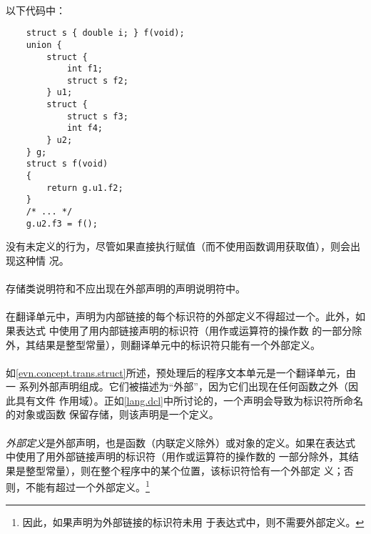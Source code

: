 {\paragraph{}
\ex* 以下代码中：
\begin{lstlisting}
    struct s { double i; } f(void);
    union {
        struct {
            int f1;
            struct s f2;
        } u1;
        struct {
            struct s f3;
            int f4;
        } u2;
    } g;
    struct s f(void)
    {
        return g.u1.f2;
    }
    /* ... */
    g.u2.f3 = f();
\end{lstlisting}
没有未定义的行为，尽管如果直接执行赋值（而不使用函数调用获取值），则会出现这种情
况。

\syntax
\paragraph{}

\constraint
\paragraph{}
存储类说明符和不应出现在外部声明的声明说明符中。

\paragraph{}
在翻译单元中，声明为内部链接的每个标识符的外部定义不得超过一个。此外，如果表达式
中使用了用内部链接声明的标识符（用作或运算符的操作数
的一部分除外，其结果是整型常量），则翻译单元中的标识符只能有一个外部定义。

\semantic
\paragraph{}
如\ref{evn.concept.trans.struct}所述，预处理后的程序文本单元是一个翻译单元，由一
系列外部声明组成。它们被描述为``外部''，因为它们出现在任何函数之外（因此具有文件
作用域）。正如\ref{lang.dcl}中所讨论的，一个声明会导致为标识符所命名的对象或函数
保留存储，则该声明是一个定义。

\paragraph{}
\textit{外部定义}是外部声明，也是函数（内联定义除外）或对象的定义。如果在表达式
中使用了用外部链接声明的标识符（用作或运算符的操作数的
一部分除外，其结果是整型常量），则在整个程序中的某个位置，该标识符恰有一个外部定
义；否则，不能有超过一个外部定义。\footnote{因此，如果声明为外部链接的标识符未用
于表达式中，则不需要外部定义。}

}
